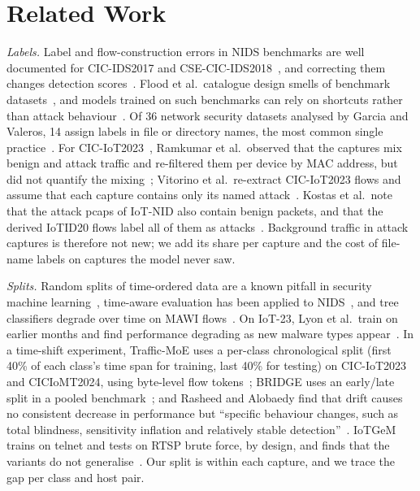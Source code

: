 \section{Related Work}\label{sec:related}

\emph{Labels.} Label and flow-construction errors in NIDS benchmarks are well documented for CIC-IDS2017 and CSE-CIC-IDS2018~\cite{engelen2021troubleshooting,liu2022error}, and correcting them changes detection scores~\cite{lanvin2023errors}. Flood et al.\ catalogue design smells of benchmark datasets~\cite{flood2024smells}, and models trained on such benchmarks can rely on shortcuts rather than attack behaviour~\cite{jacobs2022emperor}. Of 36 network security datasets analysed by Garcia and Valeros, 14 assign labels in file or directory names, the most common single practice~\cite{garcia2023labeling}. For CIC-IoT2023~\cite{neto2023ciciot2023}, Ramkumar et al.\ observed that the captures mix benign and attack traffic and re-filtered them per device by MAC address, but did not quantify the mixing~\cite{ramkumar2024diagnosing}; Vitorino et al.\ re-extract CIC-IoT2023 flows and assume that each capture contains only its named attack~\cite{vitorino2025revisiting}. Kostas et al.\ note that the attack pcaps of IoT-NID also contain benign packets, and that the derived IoTID20 flows label all of them as attacks~\cite[App.~A.3]{kostas2024iotgem}. Background traffic in attack captures is therefore not new; we add its share per capture and the cost of file-name labels on captures the model never saw.

\emph{Splits.} Random splits of time-ordered data are a known pitfall in security machine learning~\cite{arp2022dos,pendlebury2019tesseract,apruzzese2023sok}, time-aware evaluation has been applied to NIDS~\cite{andresini2021insomnia}, and tree classifiers degrade over time on MAWI flows~\cite{schraven2026mawiflow}. On IoT-23, Lyon et al.\ train on earlier months and find performance degrading as new malware types appear~\cite{lyon2026iot23drift}. In a time-shift experiment, Traffic-MoE uses a per-class chronological split (first 40\% of each class's time span for training, last 40\% for testing) on CIC-IoT2023 and CICIoMT2024, using byte-level flow tokens~\cite{zhou2026trafficmoe}; BRIDGE uses an early/late split in a pooled benchmark~\cite{bridge2026tchnet}; and Rasheed and Alobaedy find that drift causes no consistent decrease in performance but ``specific behaviour changes, such as total blindness, sensitivity inflation and relatively stable detection''~\cite{rasheed2026drift}. IoTGeM trains on telnet and tests on RTSP brute force, by design, and finds that the variants do not generalise~\cite{kostas2024iotgem}. Our split is within each capture, and we trace the gap per class and host pair.

